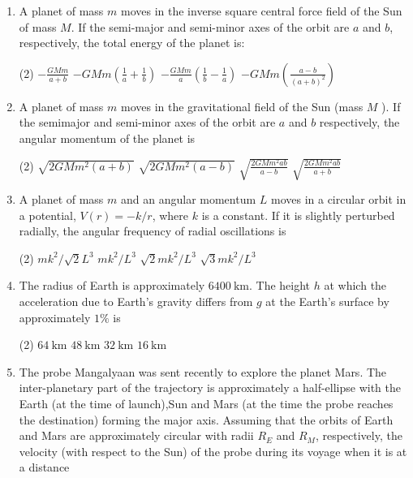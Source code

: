 \begin{enumerate}
	\item A planet of mass $m$ moves in the inverse square central force field of the Sun of mass $M$. If the semi-major and semi-minor axes of the orbit are $a$ and $b$, respectively, the total energy of the planet is:
	{}
\begin{tasks}(2)
	\task[\textbf{A.}] $-\frac{G M m}{a+b}$
	\task[\textbf{B.}]$-G M m\left(\frac{1}{a}+\frac{1}{b}\right)$
	\task[\textbf{C.}]$-\frac{G M m}{a}\left(\frac{1}{b}-\frac{1}{a}\right)$
	\task[\textbf{D.}]$-G M m\left(\frac{a-b}{(a+b)^{2}}\right)$
\end{tasks}
	\item A planet of mass $m$ moves in the gravitational field of the Sun (mass $M$ ). If the semimajor and semi-minor axes of the orbit are $a$ and $b$ respectively, the angular momentum of the planet is
	{}
\begin{tasks}(2)
	\task[\textbf{A.}]$\sqrt{2 G M m^{2}(a+b)}$
	\task[\textbf{B.}]$\sqrt{2 G M m^{2}(a-b)}$
	\task[\textbf{C.}]$\sqrt{\frac{2 G M m^{2} a b}{a-b}}$
	\task[\textbf{D.}]$\sqrt{\frac{2 G M m^{2} a b}{a+b}}$
\end{tasks}
	\item A planet of mass $m$ and an angular momentum $L$ moves in a circular orbit in a potential, $V(r)=-k / r$, where $k$ is a constant. If it is slightly perturbed radially, the angular frequency of radial oscillations is
	{}
\begin{tasks}(2)
	\task[\textbf{A.}] $m k^{2} / \sqrt{2} L^{3}$
	\task[\textbf{B.}]$m k^{2} / L^{3}$
	\task[\textbf{C.}]$\sqrt{2} m k^{2} / L^{3}$
	\task[\textbf{D.}]$\sqrt{3} m k^{2} / L^{3}$
\end{tasks}
	\item The radius of Earth is approximately $6400 \mathrm{~km}$. The height $h$ at which the acceleration due to Earth's gravity differs from $g$ at the Earth's surface by approximately $1 \%$ is
	{}
\begin{tasks}(2)
	\task[\textbf{A.}] $64 \mathrm{~km}$
	\task[\textbf{B.}] $48 \mathrm{~km}$
	\task[\textbf{C.}]$32 \mathrm{~km}$
	\task[\textbf{D.}]$16 \mathrm{~km}$
\end{tasks}
	\item The probe Mangalyaan was sent recently to explore the planet Mars. The inter-planetary part of the trajectory is approximately a half-ellipse with the Earth (at the time of launch),Sun and Mars (at the time the probe reaches the destination) forming the major axis. Assuming that the orbits of Earth and Mars are approximately circular with radii $R_{E}$ and $R_{M}$, respectively, the velocity (with respect to the Sun) of the probe during its voyage when it is at a distance

\end{enumerate}
